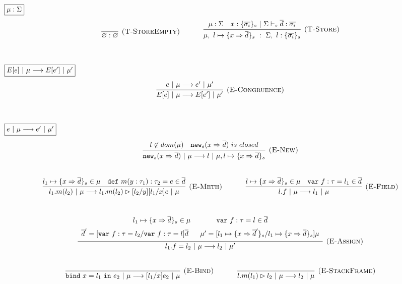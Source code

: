 \documentclass{llncs}
\newcommand{\keywadj}[1]{\mathtt{#1}}
\newcommand{\keyw}[1]{\keywadj{#1}~}
\begin{document}
$\fbox{$\mu : \Sigma$}$
\[
\begin{array}{c}

\infer[\textsc{(T-StoreEmpty)}]
  {\varnothing : \varnothing}
  {}%
~~~~~~~~~~
\infer[\textsc{(T-Store)}]
  {\mu,~l \mapsto \{ x \Rightarrow \overline{d} \}_s~:~\Sigma,~l : \{ \overline{\sigma_i} \}_s}
  {\mu : \Sigma & x : \{ \overline{\sigma_i} \}_s~|~\Sigma \vdash_s \overline{d} : \overline{\sigma_i}}\\[5ex]

\end{array}
\]

$\fbox{$E[e]~|~\mu \longrightarrow E[e']~|~\mu'$}$
\[
\begin{array}{c}
\infer[\textsc{(E-Congruence)}]
  {E[e]~|~\mu \longrightarrow E[e']~|~\mu'}
  {e~|~\mu \longrightarrow e'~|~\mu'}\\[5ex]  
\end{array}
\]


$\fbox{$e~|~\mu \longrightarrow e'~|~\mu'$}$
\[
\begin{array}{c}
\infer[\textsc{(E-New)}]
  {\keywadj{new}_{s}(x \Rightarrow \overline{d})~|~\mu \longrightarrow l~|~\mu, l \mapsto \{ x \Rightarrow \overline{d} \}_{s}}
  {l \not\in dom(\mu) & \keywadj{new}_{s}(x \Rightarrow \overline{d})~is~closed}\\[5ex]

\infer[\textsc{(E-Meth)}]
  {l_1.m(l_2)~|~\mu \longrightarrow l_1.m(l_2) \rhd [l_2/y][l_1/x]e~|~\mu}
  {l_1 \mapsto \{ x \Rightarrow \overline{d} \}_{s} \in \mu & \keyw{def} m(y : \tau_1) : \tau_2 = e \in \overline{d}}%
~~~~~~~~~~
\infer[\textsc{(E-Field)}]
  {l.f~|~\mu \longrightarrow l_1~|~\mu}
  {l \mapsto \{ x \Rightarrow \overline{d} \}_{s} \in \mu & \keyw{var} f:\tau = l_1 \in \overline{d}}\\[5ex]

\infer[\textsc{(E-Assign)}]
  {l_1.f = l_2~|~\mu \longrightarrow l_2~|~\mu'}
  {\def\arraystretch{1.6}
  \begin{array}{c}
l_1 \mapsto \{ x \Rightarrow \overline{d} \}_{s} \in \mu~~~~~~~~~~~\keyw{var} f:\tau = l \in \overline{d} \\
\overline{d}' = [\keyw{var} f:\tau = l_2/\keyw{var} f:\tau = l]\overline{d}~~~~~\mu' = [l_1 \mapsto \{ x \Rightarrow \overline{d}' \}_{s}/l_1 \mapsto \{ x \Rightarrow \overline{d} \}_{s}]\mu
  \end{array}}\\[5ex]

\infer[\textsc{(E-Bind)}]
  {\keyw{bind} x = l_1~\keyw{in} e_2~|~\mu \longrightarrow [l_1/x]e_2~|~\mu}
  {}%
~~~~~~~~~~
\infer[\textsc{(E-StackFrame)}]
  {l.m(l_1) \rhd l_2~|~\mu \longrightarrow l_2~|~\mu}
  {}\\[5ex]
  
\end{array}
\]
\end{document}
